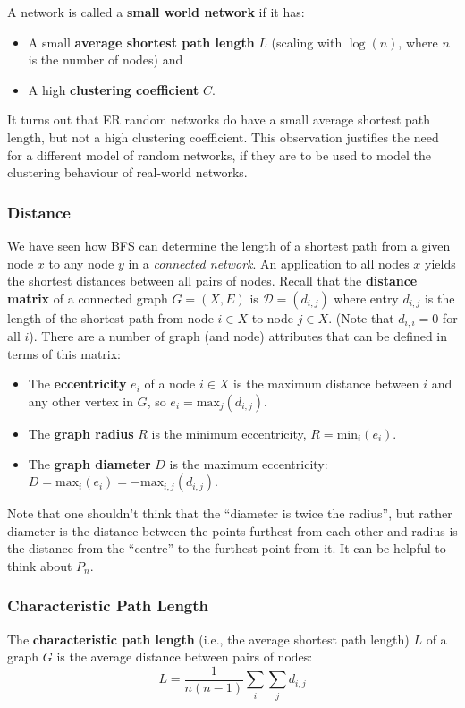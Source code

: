 \documentclass[a4paper,11pt]{article}
\begin{document}
A network is called a \textbf{small world network} if it has:
\begin{itemize}
    \item   A small \textbf{average shortest path length} $L$ (scaling with $\log(n)$, where $n$ is the number of nodes) and
    \item   A high \textbf{clustering coefficient} $C$.
\end{itemize}

It turns out that ER random networks do have a small average shortest path length, but not a high clustering coefficient.
This observation justifies the need for a different model of random networks, if they are to be used to model the clustering behaviour of real-world networks.

\subsubsection{Distance}
We have seen how BFS can determine the length of a shortest path from a given node $x$ to any node $y$ in a \textit{connected network}.
An application to all nodes $x$ yields the shortest distances between all pairs of nodes.
Recall that the \textbf{distance matrix} of a connected graph $G = (X,E)$ is $\mathcal{D} = (d_{i,j})$ where entry $d_{i,j}$ is the length of the shortest path from node $i \in X$ to node $j \in X$.
(Note that $d_{i,i} = 0$ for all $i$).
There are a number of graph (and node) attributes that can be defined in terms of this matrix:
\begin{itemize}
    \item   The \textbf{eccentricity} $e_i$ of a node $i \in X$ is the maximum distance between $i$ and any other vertex in $G$, so $e_i = \text{max}_j(d_{i,j})$.
    \item   The \textbf{graph radius} $R$ is the minimum eccentricity, $R = \text{min}_i(e_i)$.
    \item   The \textbf{graph diameter} $D$ is the maximum eccentricity: $D = \text{max}_i(e_i) = - \text{max}_{i,j} (d_{i,j})$.
\end{itemize}

Note that one shouldn't think that the ``diameter is twice the radius'', but rather diameter is the distance between the points furthest from each other and radius is the distance from the ``centre'' to the furthest point from it.
It can be helpful to think about $P_n$.

\subsubsection{Characteristic Path Length}
The \textbf{characteristic path length} (i.e., the average shortest path length) $L$ of a graph $G$ is the average distance between pairs of nodes:
\[
    L = \frac{1}{n(n-1)} \sum_i \sum_j d_{i,j}
\]
\end{document}
